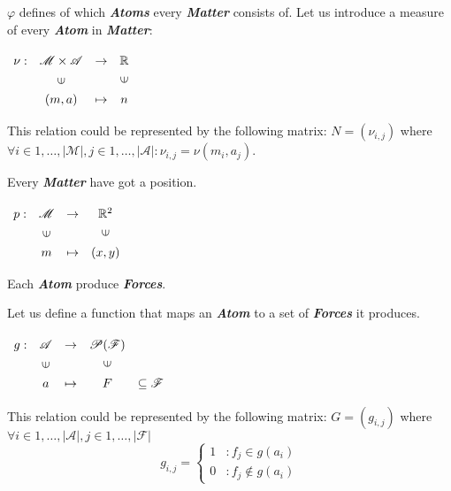 \documentclass[a4paper]{article}
\begin{document}
$\varphi $ defines of which \textit{\textbf{Atoms}} every \textit{\textbf{Matter}} consists of. Let us introduce a measure of every \textit{\textbf{Atom}} in \textit{\textbf{Matter}}:

$\renewcommand{\arraystretch}{1.3}
\begin{array}[c]{ccccc}
{\nu}:&\mathscr{M} \times \mathscr{A} &\rightarrow&\mathbb{R}\\
&\rotatebox[origin=c]{90}{{$\in$}}&&\rotatebox{90}{$\in$}&\\
&(m, a)&\mapsto& n
\end{array}$

This relation could be represented by the following matrix:
$ {N}=\left(\nu_{{i,j}}\right) $ where $ \forall i \in 1,\dots,|\mathscr{M}|, j \in 1,\dots,|\mathscr{A}| : \nu_{{i,j}}=\nu \left( m_{{i}},a_{{j}} \right) $.

Every \textit{\textbf{Matter}} have got a position.

$\renewcommand{\arraystretch}{1.3}
\begin{array}[c]{ccccc}
{p}:&\mathscr{M} &\rightarrow&\mathbb{R}^2\\
&\rotatebox[origin=c]{90}{{$\in$}}&&\rotatebox{90}{$\in$}&\\
&m&\mapsto& (x, y) & 
\end{array}$

Each \textit{\textbf{Atom}} produce \textit{\textbf{Forces}}.

Let us define a function that maps an \textit{\textbf{Atom}} to a set of \textit{\textbf{Forces}} it produces.

$\renewcommand{\arraystretch}{1.3}
\begin{array}[c]{ccccc}
{g}:&\mathscr{A} &\rightarrow&\mathscr{P}(\mathscr{F})\\
&\rotatebox[origin=c]{90}{{$\in$}}&&\rotatebox{90}{$\in$}&\\
&a&\mapsto&F& \subseteq \mathscr{F}
\end{array}$

This relation could be represented by the following matrix:
$ {G}=\left(g_{{i,j}}\right) $ where
$  \forall i \in 1,\dots,|\mathscr{A}|, j \in 1,\dots,|\mathscr{F}| $
\begin{displaymath}
   g_{{i,j}} = \left\{
     \begin{array}{lr}
       1 & : f_j \in g(a_i)\\
       0 & : f_j \notin g(a_i)
     \end{array}
   \right.
\end{displaymath}
\end{document}
